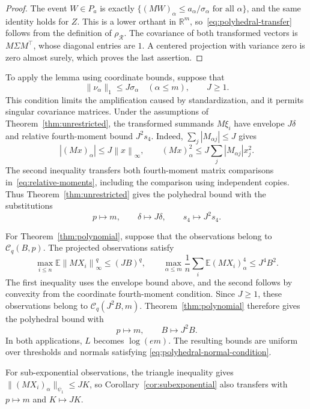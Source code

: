 \documentclass[11pt,letterpaper]{article}
\theoremstyle{remark}
\newcommand{\E}{\mathbb E}
\newcommand{\R}{\mathbb R}
\newcommand{\norm}[1]{\left\lVert#1\right\rVert}
\newcommand{\rh}{\rho_{\mathcal R}}
\begin{document}
\begin{proof}
The event \(W\in P_a\) is exactly
\(\{(MW)_\alpha\le a_\alpha/\sigma_\alpha\text{ for all }\alpha\}\),
and the same identity holds for \(Z\). This is a lower orthant in
\(\R^m\), so~\eqref{eq:polyhedral-transfer} follows from the
definition of \(\rh\). The covariance of both transformed vectors
is \(M\Sigma M^\top\), whose diagonal entries are \(1\).
A centered projection with variance zero is zero almost surely,
which proves the last assertion.
\end{proof}

To apply the lemma using coordinate bounds, suppose that
\begin{equation}
 \|\nu_\alpha\|_1\le J\sigma_\alpha\quad(\alpha\le m),
 \qquad J\ge1.
 \label{eq:polyhedral-normal-condition}
\end{equation}
This condition limits the amplification caused by standardization,
and it permits singular covariance matrices. Under the assumptions
of Theorem~\ref{thm:unrestricted}, the transformed summands
\(M\xi_i\) have envelope \(J\delta\) and relative fourth-moment
bound \(J^2s_4\). Indeed, \(\sum_j|M_{\alpha j}|\le J\) gives
\[
 |(Mx)_\alpha|\le J\norm{x}_\infty,
 \qquad
 (Mx)_\alpha^2\le J\sum_j|M_{\alpha j}|x_j^2.
\]
The second inequality transfers both fourth-moment matrix comparisons
in~\eqref{eq:relative-moments}, including the comparison using
independent copies. Thus Theorem~\ref{thm:unrestricted} gives the
polyhedral bound with the substitutions
\[
 p\mapsto m,\qquad \delta\mapsto J\delta,\qquad s_4\mapsto J^2s_4.
\]

For Theorem~\ref{thm:polynomial}, suppose that the observations belong
to \(\mathcal C_q(B,p)\). The projected observations satisfy
\[
 \max_{i\le n}\E\norm{MX_i}_\infty^q\le (JB)^q,
 \qquad
 \max_{\alpha\le m}\frac1n\sum_i\E(MX_i)_\alpha^4
 \le J^4B^2.
\]
The first inequality uses the envelope bound above, and the second
follows by convexity from the coordinate fourth-moment condition.
Since \(J\ge1\), these observations belong to
\(\mathcal C_q(J^2B,m)\). Theorem~\ref{thm:polynomial} therefore
gives the polyhedral bound with
\[
 p\mapsto m,\qquad B\mapsto J^2B.
\]
In both applications, \(L\) becomes \(\log(em)\). The resulting
bounds are uniform over thresholds and normals satisfying
\eqref{eq:polyhedral-normal-condition}.

For sub-exponential observations, the triangle inequality gives
\(\|(MX_i)_\alpha\|_{\psi_1}\le JK\), so Corollary~\ref{cor:subexponential}
also transfers with \(p\mapsto m\) and \(K\mapsto JK\).
\end{document}
